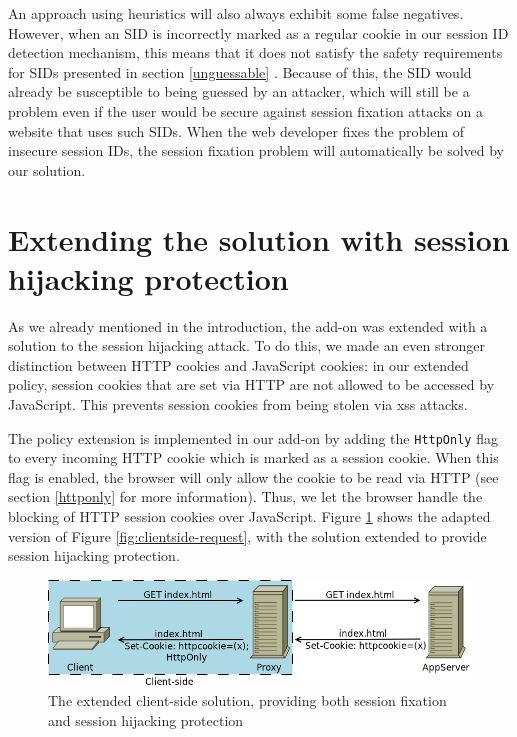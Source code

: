 An approach using heuristics will also always exhibit some false negatives. However, when an SID is incorrectly marked as a regular cookie in our session ID detection mechanism, this means that it does not satisfy the safety requirements for SIDs presented in section \ref{unguessable} \cite{Nikiforakis2010}. Because of this, the SID would already be susceptible to being guessed by an attacker, which will still be a problem even if the user would be secure against session fixation attacks on a website that uses such SIDs. When the web developer fixes the problem of insecure session IDs, the session fixation problem will automatically be solved by our solution.

\section{Extending the solution with session hijacking protection}

As we already mentioned in the introduction, the add-on was extended with a solution to the session hijacking attack. To do this, we made an even stronger distinction between HTTP cookies and JavaScript cookies: in our extended policy, session cookies that are set via HTTP are not allowed to be accessed by JavaScript. This prevents session cookies from being stolen via \gls{xss} attacks.

The policy extension is implemented in our add-on by adding the \texttt{HttpOnly} flag to every incoming HTTP cookie which is marked as a session cookie. When this flag is enabled, the browser will only allow the cookie to be read via HTTP (see section \ref{httponly} for more information). Thus, we let the browser handle the blocking of HTTP session cookies over JavaScript. Figure \ref{fig:clientside-httponly} shows the adapted version of Figure \ref{fig:clientside-request}, with the solution extended to provide session hijacking protection.

\begin{figure}[htb]
	\centering
	\includegraphics[width=.7\textwidth]{img/clientside-proxy-3.png}
	\caption[The extended client-side solution]{The extended client-side solution, providing both session fixation and session hijacking protection}
	\label{fig:clientside-httponly}
\end{figure}
 
